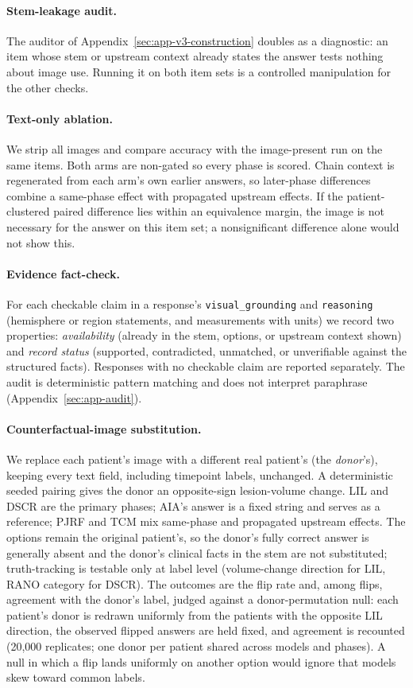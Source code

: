 \documentclass[11pt]{article}
\begin{document}
\paragraph{Stem-leakage audit.} The auditor of Appendix~\ref{sec:app-v3-construction} doubles as a diagnostic: an item whose stem or upstream context already states the answer tests nothing about image use. Running it on both item sets is a controlled manipulation for the other checks.

\paragraph{Text-only ablation.} We strip all images and compare accuracy with the image-present run on the same items. Both arms are non-gated so every phase is scored. Chain context is regenerated from each arm's own earlier answers, so later-phase differences combine a same-phase effect with propagated upstream effects. If the patient-clustered paired difference lies within an equivalence margin, the image is not necessary for the answer on this item set; a nonsignificant difference alone would not show this.

\paragraph{Evidence fact-check.} For each checkable claim in a response's \texttt{visual\_grounding} and \texttt{reasoning} (hemisphere or region statements, and measurements with units) we record two properties: \emph{availability} (already in the stem, options, or upstream context shown) and \emph{record status} (supported, contradicted, unmatched, or unverifiable against the structured facts). Responses with no checkable claim are reported separately. The audit is deterministic pattern matching and does not interpret paraphrase (Appendix~\ref{sec:app-audit}).

\paragraph{Counterfactual-image substitution.} We replace each patient's image with a different real patient's (the \emph{donor}'s), keeping every text field, including timepoint labels, unchanged. A deterministic seeded pairing gives the donor an opposite-sign lesion-volume change. LIL and DSCR are the primary phases; AIA's answer is a fixed string and serves as a reference; PJRF and TCM mix same-phase and propagated upstream effects. The options remain the original patient's, so the donor's fully correct answer is generally absent and the donor's clinical facts in the stem are not substituted; truth-tracking is testable only at label level (volume-change direction for LIL, RANO category for DSCR). The outcomes are the flip rate and, among flips, agreement with the donor's label, judged against a donor-permutation null: each patient's donor is redrawn uniformly from the patients with the opposite LIL direction, the observed flipped answers are held fixed, and agreement is recounted (20,000 replicates; one donor per patient shared across models and phases). A null in which a flip lands uniformly on another option would ignore that models skew toward common labels.
\end{document}
